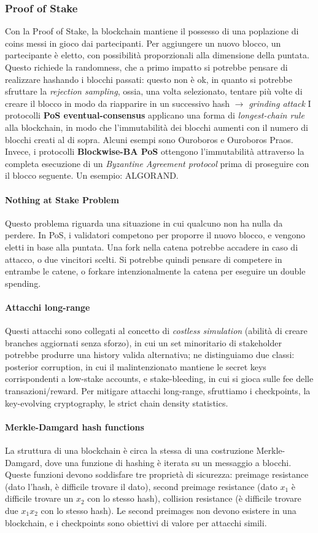 \documentclass[11pt]{article}
\begin{document}
\subsubsection{Proof of Stake} Con la Proof of Stake, la blockchain mantiene il possesso di una poplazione di coins messi in gioco dai partecipanti. Per aggiungere un nuovo blocco, un partecipante è eletto, con possibilità proporzionali alla dimensione della puntata. Questo richiede la randomness, che a primo impatto si potrebbe pensare di realizzare hashando i blocchi passati: questo non è ok, in quanto si potrebbe sfruttare la \textit{rejection sampling}, ossia, una volta selezionato, tentare più volte di creare il blocco in modo da riapparire in un successivo hash $\rightarrow$ \textit{grinding attack}
I protocolli \textbf{PoS eventual-consensus} applicano una forma di \textit{longest-chain rule} alla blockchain, in modo che l'immutabilità dei blocchi aumenti con il numero di blocchi creati al di sopra. Alcuni esempi sono Ouroboros e Ouroboros Praos. 
Invece, i protocolli \textbf{Blockwise-BA PoS} ottengono l'immutabilità attraverso la completa esecuzione di un \textit{Byzantine Agreement protocol} prima di proseguire con il blocco seguente. Un esempio: ALGORAND. 
\paragraph{Nothing at Stake Problem} Questo problema riguarda una situazione in cui qualcuno non ha nulla da perdere. In PoS, i validatori competono per proporre il nuovo blocco, e vengono eletti in base alla puntata. Una fork nella catena potrebbe accadere in caso di attacco, o due vincitori scelti. Si potrebbe quindi pensare di competere in entrambe le catene, o forkare intenzionalmente la catena per eseguire un double spending.
\paragraph{Attacchi long-range} Questi attacchi sono collegati al concetto di \textit{costless simulation} (abilità di creare branches aggiornati senza sforzo), in cui un set minoritario di stakeholder potrebbe produrre una history valida alternativa; ne distinguiamo due classi: posterior corruption, in cui il malintenzionato mantiene le secret keys corrispondenti a low-stake accounts, e stake-bleeding, in cui si gioca sulle fee delle transazioni/reward. Per mitigare attacchi long-range, sfruttiamo i checkpoints, la key-evolving cryptography, le strict chain density statistics. 
\paragraph{Merkle-Damgard hash functions} 
La struttura di una blockchain è circa la stessa di una costruzione Merkle-Damgard, dove una funzione di hashing è iterata su un messaggio a blocchi. Queste funzioni devono soddisfare tre proprietà di sicurezza: preimage resistance (dato l'hash, è difficile trovare il dato), second preimage resistance (dato $x_1$ è difficile trovare un $x_2$ con lo stesso hash), collision resistance (è difficile trovare due $x_1 x_2$ con lo stesso hash). Le second preimages non devono esistere in una blockchain, e i checkpoints sono obiettivi di valore per attacchi simili. 
\end{document}
